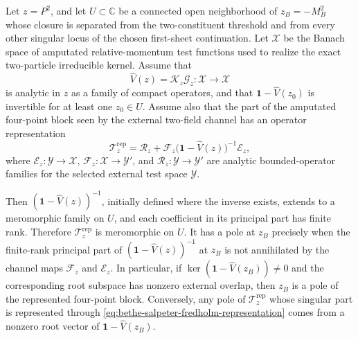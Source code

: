 \begin{theorem}
\label{thm:bethe-salpeter-fredholm-pole-criterion}
Let \(z=P^2\), and let \(U\subset\mathbb C\) be a connected open neighborhood
of \(z_B=-M_B^2\) whose closure is separated from the two-constituent
threshold and from every other singular locus of the chosen first-sheet
continuation.  Let \(\mathcal X\) be the Banach space of amputated
relative-momentum test functions used to realize the exact two-particle
irreducible kernel.  Assume that
\[
  \widehat V(z)=\mathcal K_z\mathcal G_z:\mathcal X\to\mathcal X
\]
is analytic in \(z\) as a family of compact operators, and that
\(\mathbf 1-\widehat V(z_0)\) is invertible for at least one \(z_0\in U\).
Assume also that the part of the amputated four-point block seen by the
external two-field channel has an operator representation
\begin{equation}
  \mathcal T_z^{\mathrm{rep}}
  =
  \mathcal R_z+\mathcal F_z
  \bigl(\mathbf 1-\widehat V(z)\bigr)^{-1}\mathcal E_z ,
  \label{eq:bethe-salpeter-fredholm-representation}
\end{equation}
where \(\mathcal E_z:\mathcal Y\to\mathcal X\),
\(\mathcal F_z:\mathcal X\to\mathcal Y'\), and
\(\mathcal R_z:\mathcal Y\to\mathcal Y'\) are analytic bounded-operator
families for the selected external test space \(\mathcal Y\).

Then \((\mathbf 1-\widehat V(z))^{-1}\), initially defined where the inverse
exists, extends to a meromorphic family on \(U\), and each coefficient in its
principal part has finite rank.  Therefore
\(\mathcal T_z^{\mathrm{rep}}\) is meromorphic on \(U\).  It has a pole at
\(z_B\) precisely when the finite-rank principal part of
\((\mathbf 1-\widehat V(z))^{-1}\) at \(z_B\) is not annihilated by the channel
maps \(\mathcal F_z\) and \(\mathcal E_z\).  In particular, if
\(\ker(\mathbf 1-\widehat V(z_B))\ne0\) and the corresponding root subspace
has nonzero external overlap, then \(z_B\) is a pole of the represented
four-point block.  Conversely, any pole of \(\mathcal T_z^{\mathrm{rep}}\)
whose singular part is represented through
\eqref{eq:bethe-salpeter-fredholm-representation} comes from a nonzero
root vector of \(\mathbf 1-\widehat V(z_B)\).


\end{theorem}
